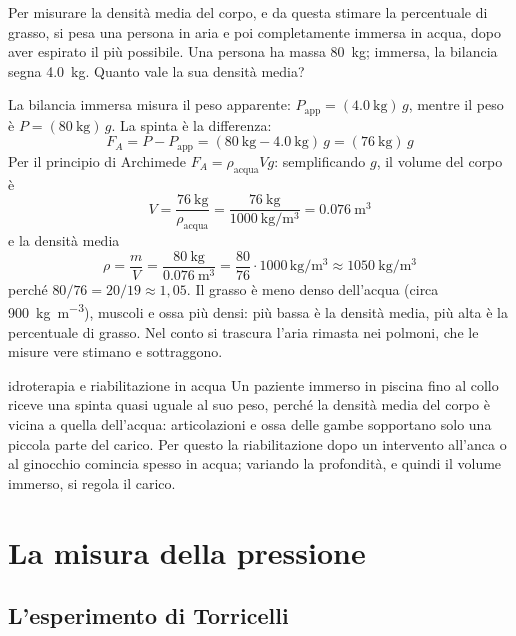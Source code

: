 \begin{esempio}
Per misurare la densità media del corpo, e da questa stimare la percentuale di grasso, si pesa una persona in aria e poi completamente immersa in acqua, dopo aver espirato il più possibile. Una persona ha massa \SI{80}{\kilo\gram}; immersa, la bilancia segna \SI{4,0}{\kilo\gram}. Quanto vale la sua densità media?

La bilancia immersa misura il peso apparente: $P_\text{app} = (\SI{4,0}{\kilo\gram})\,g$, mentre il peso è $P = (\SI{80}{\kilo\gram})\,g$. La spinta è la differenza:
\[
  F_A = P - P_\text{app} = (\SI{80}{\kilo\gram} - \SI{4,0}{\kilo\gram})\,g = (\SI{76}{\kilo\gram})\,g
\]
Per il principio di Archimede $F_A = \rho_\text{acqua} V g$: semplificando $g$, il volume del corpo è
\[
  V = \frac{\SI{76}{\kilo\gram}}{\rho_\text{acqua}} = \frac{\SI{76}{\kilo\gram}}{\SI{1000}{\kilo\gram\per\metre\cubed}} = \SI{0,076}{\metre\cubed}
\]
e la densità media
\[
  \rho = \frac{m}{V} = \frac{\SI{80}{\kilo\gram}}{\SI{0,076}{\metre\cubed}} = \frac{80}{76} \cdot 1000\,\si{\kilo\gram\per\metre\cubed} \approx \SI{1050}{\kilo\gram\per\metre\cubed}
\]
perché $80/76 = 20/19 \approx 1{,}05$. Il grasso è meno denso dell'acqua (circa \SI{900}{\kilo\gram\per\metre\cubed}), muscoli e ossa più densi: più bassa è la densità media, più alta è la percentuale di grasso. Nel conto si trascura l'aria rimasta nei polmoni, che le misure vere stimano e sottraggono.
\end{esempio}



\begin{applicazione}{idroterapia e riabilitazione in acqua}
Un paziente immerso in piscina fino al collo riceve una spinta quasi uguale al suo peso, perché la densità media del corpo è vicina a quella dell'acqua: articolazioni e ossa delle gambe sopportano solo una piccola parte del carico. Per questo la riabilitazione dopo un intervento all'anca o al ginocchio comincia spesso in acqua; variando la profondità, e quindi il volume immerso, si regola il carico.
\end{applicazione}

\section{La misura della pressione}
\label{sec:ud3-misura}

\subsection{L'esperimento di Torricelli}

